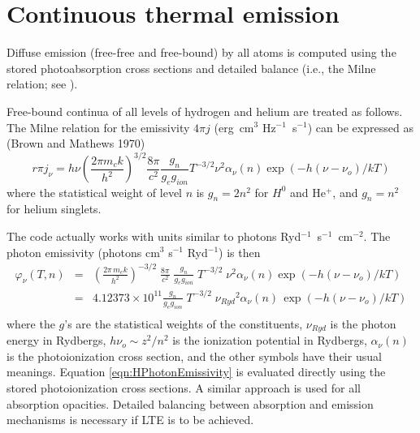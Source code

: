 \section{Continuous thermal emission}

Diffuse emission (free-free and free-bound) by all atoms is computed using
the stored photoabsorption cross sections and detailed balance (i.e., the
Milne relation; see \citealp{Mihalas1978}).

Free-bound continua of all levels of hydrogen and helium are treated as
follows.  The Milne relation for the emissivity $4\pi j$ (erg~cm$^3$
Hz$^{-1}$~s$^{-1}$) can
be expressed as (Brown and Mathews 1970)
\begin{equation}
r\pi j_\nu = h\nu \left(\frac{2\pi m_ck}{h^2}\right)^{3/2} \frac{8\pi}{c^2}
\frac{g_n}{g_eg_{ion}} T^{-3/2}\nu^2 \alpha_\nu (n) \exp
\left(-h(\nu-\nu_o)/kT\right)
\end{equation}
where the statistical weight of level $n$ is $g_n = 2n^2$ for $H^0$ and
He$^+$, and
$g_n = n^2$ for helium singlets.

The code actually works with units similar to photons
Ryd$^{-1}$~s$^{-1}$~cm$^{-2}$.  The
photon emissivity (photons cm$^3$ s$^{-1}$ Ryd$^{-1}$) is then
\begin{equation}
\label{eqn:HPhotonEmissivity}
\begin{array}{ccc}
 {\varphi _\nu }\left( {T,n} \right)&  =& {\left( {\frac{{2\pi
\,{m_e}k}}{{{h^2}}}} \right)^{ - 3/2}}\;\frac{{8\pi
}}{{{c^2}}}\;\frac{{{g_n}}}{{{g_e}{g_{ion}}}}\;{T^{ - 3/2}}\;{\nu ^2}{\alpha
_\nu }\left( n \right)\exp \left( { - h\left( {\nu  - {\nu _o}} \right)/kT}
\right) \\
&=& 4.12373 \times {10^{11}}\frac{{{g_n}}}{{{g_e}{g_{ion}}}}\;{T^{ -
3/2}}\;{\nu _{Ryd}}^2{\alpha _\nu }\left( n \right)\,\exp \left( { - h\left(
{\nu  - {\nu _o}} \right)/kT} \right) \\
 \end{array}
\end{equation}
where the $g$'s are the statistical weights of the constituents, $\nu_{Ryd}$ is the
photon energy in Rydbergs, $h\nu_o\sim z^2/n^2$ is the ionization potential in Rydbergs,
$\alpha_\nu(n)$ is the photoionization cross section, and the other symbols have their
usual meanings.
Equation \ref{eqn:HPhotonEmissivity} is evaluated directly using the stored
photoionization cross sections.  A similar approach is used for all
absorption opacities.  Detailed balancing between absorption and emission
mechanisms is necessary if LTE is to be achieved.

